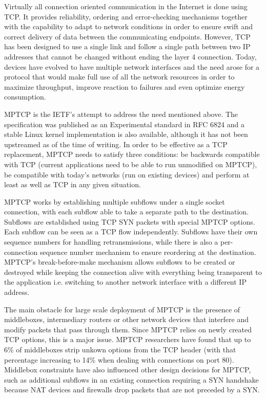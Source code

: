 
Virtually all connection oriented communication in the Internet is done using TCP. It provides reliability, ordering and error-checking mechanisms together with the capability to adapt to network conditions in order to ensure swift and correct delivery of data between the communicating endpoints. However, TCP has been designed to use a single link and follow a single path between two IP addresses that cannot be changed without ending the layer 4 connection. Today, devices have evolved to have multiple network interfaces and the need arose for a protocol that would make full use of all the network resources in order to maximize throughput, improve reaction to failures and even optimize energy consumption.

MPTCP is the IETF's attempt to address the need mentioned above. The specification was published as an Experimental standard in RFC 6824 and a stable Linux kernel implementation is also available, although it has not been upstreamed as of the time of writing. In order to be effective as a TCP replacement, MPTCP needs to satisfy three conditions: be backwards compatible with TCP (current applications need to be able to run unmodified on MPTCP), be compatible with today's networks (run on existing devices) and perform at least as well as TCP in any given situation.

MPTCP works by establishing multiple subflows under a single socket connection, with each subflow able to take a separate path to the destination. Subflows are established using TCP SYN packets with special MPTCP options. Each subflow can be seen as a TCP flow independently. Subflows have their own sequence numbers for handling retransmissions, while there is also a per-connection sequence number mechanism to ensure reordering at the destination. MPTCP's break-before-make mechanism allows subflows to be created or destroyed while keeping the connection alive with everything being transparent to the application i.e. switching to another network interface with a different IP address.

The main obstacle for large scale deployment of MPTCP is the presence of middleboxes, intermediary routers or other network devices that interfere and modify packets that pass through them. Since MPTCP relies on newly created TCP options, this is a major issue. MPTCP researchers have found that up to 6\% of middleboxes strip unkown options from the TCP header (with that percentage increasing to 14\% when dealing with connections on port 80). Middlebox constraints have also influenced other design decisions for MPTCP, such as additional subflows in an existing connection requiring a SYN handshake because NAT devices and firewalls drop packets that are not preceded by a SYN.

